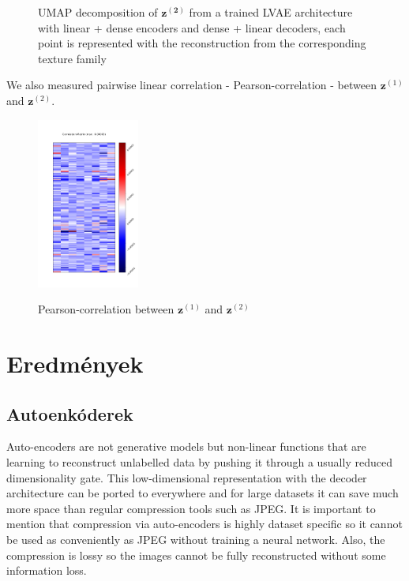 \documentclass[12pt, english]{article}
\begin{document}
\begin{figure}[H]
\begin{minipage}{0.48\linewidth}
    \caption{UMAP decomposition of $\bm{z^{(2)}}$ from a trained LVAE architecture with linear + dense encoders and dense + linear decoders, each point is represented with the reconstruction from the corresponding texture family} 
    \label{fig:umap-z2-text}
  \end{minipage} 
\end{figure}

\vspace{4mm}

\par We also measured pairwise linear correlation - Pearson-correlation - between $\bm{z}^{(1)}$ and $\bm{z}^{(2)}$.

\vspace{4mm}

\begin{figure}[H]
    \centering
    \includegraphics[width=0.3\textwidth]{z1_z2_correlation.png}
    \label{fig:pearson-matrix}
    \caption{Pearson-correlation between $\bm{z}^{(1)}$ and $\bm{z}^{(2)}$}
\end{figure}

\newpage

\section{Eredmények}

\vspace{7mm}

\subsection{Autoenkóderek}

\vspace{5mm}

\par Auto-encoders are not generative models but non-linear functions that are learning to reconstruct unlabelled data by pushing it through a usually reduced dimensionality gate. This low-dimensional representation with the decoder architecture can be ported to everywhere and for large datasets it can save much more space than regular compression tools such as JPEG. It is important to mention that compression via auto-encoders is highly dataset specific so it cannot be used as conveniently as JPEG without training a neural network. Also, the compression is lossy so the images cannot be fully reconstructed without some information loss.
\end{document}
